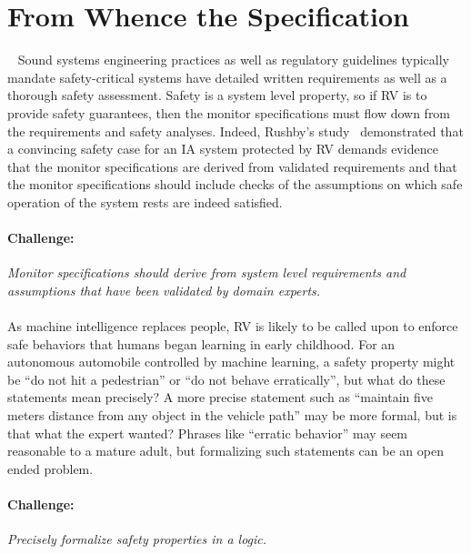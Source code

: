 \section{From Whence the Specification}~\label{sec:req} Sound systems
engineering practices as well as regulatory guidelines typically
mandate safety-critical systems have detailed written requirements as
well as a thorough safety assessment. Safety is a system level
property, so if RV is to provide safety guarantees, then the monitor
specifications must flow down from the requirements and safety
analyses.  Indeed, Rushby's study~\cite{rvRushby,RushbyAIAA09}
demonstrated that a convincing safety case for an IA system protected
by RV demands evidence that the monitor specifications are derived
from validated requirements and that the monitor specifications
should include checks of the assumptions on which safe operation of
the system rests are indeed satisfied.

\paragraph{Challenge:} \emph{ Monitor specifications should derive from
  system level requirements and assumptions that have been validated
  by domain experts.} 


\paragraph{}  As
machine intelligence replaces people, RV is likely to be called upon
to enforce safe behaviors that humans began learning in early
childhood.  For an autonomous automobile controlled by machine
learning, a safety property might be ``do not hit a pedestrian'' or
``do not behave erratically'', but what do these statements mean
precisely?  A more precise statement such as ``maintain five meters
distance from any object in the vehicle path'' may be more formal, but
is that what the expert wanted?  Phrases like ``erratic behavior''
may seem reasonable to a mature adult, but formalizing such statements
can be an open ended problem.

\paragraph{Challenge:} \emph{Precisely formalize safety properties  in
  a  logic.}


